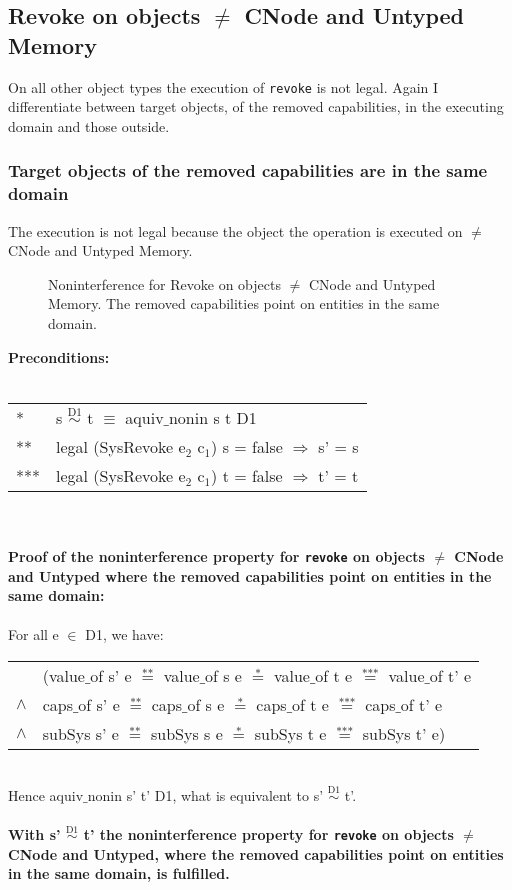 \subsection{Revoke on objects $\neq$ CNode and Untyped Memory} 
On all other object types the execution of \texttt{revoke} is not legal. Again I differentiate between target objects, of the removed capabilities, in the executing domain and those outside.
\subsubsection{Target objects of the removed capabilities are in the same domain}
The execution is not legal because the object the operation is executed on $\neq$ CNode and Untyped Memory.
\begin{figure}[H]
\caption{Noninterference for Revoke on objects $\neq$ CNode and Untyped Memory. The removed capabilities point on entities in the same domain.}
\label{fig:RevokeOthers}
\end{figure}
\textbf{Preconditions:} \\ \\
\begin{tabular}{ll}
* & s $\overset{\text{D1}}{\sim}$ t $\equiv$ aquiv$\_$nonin s t D1	\\ 
** & legal (SysRevoke e$_2$ c$_1$) s = false $\Rightarrow$ s' = s \\ 
*** & legal (SysRevoke e$_2$ c$_1$) t = false $\Rightarrow$ t' = t
\end{tabular} \\ \\ 
\textbf{Proof of the noninterference property for \texttt{revoke} on objects $\neq$ CNode and Untyped where the removed capabilities point on entities in the same domain:}\\ \\
For all e $\in$ D1, we have: \\ 
\begin{tabular}{ll}
& (value$\_$of s' e $\overset{\text{**}}{=}$ value$\_$of s e $\overset{\text{*}}{=}$ value$\_$of t e $\overset{\text{***}}{=}$ value$\_$of t' e \\
$\wedge$ & caps$\_$of s' e $\overset{\text{**}}{=}$ caps$\_$of s e $\overset{\text{*}}{=}$ caps$\_$of t e $\overset{\text{***}}{=}$ caps$\_$of t' e \\
$\wedge$ & subSys s' e $\overset{\text{**}}{=}$ subSys s e $\overset{\text{*}}{=}$ subSys t e $\overset{\text{***}}{=}$ subSys t' e)
\end{tabular} \\
Hence aquiv$\_$nonin s' t' D1, what is equivalent to s' $\overset{\text{D1}}{\sim}$ t'.\\ \\ 
\textbf{With s' $\overset{\text{D1}}{\sim}$ t' the noninterference property for \texttt{revoke} on objects $\neq$ CNode and Untyped, where the removed capabilities point on entities in the same domain, is fulfilled.}  
